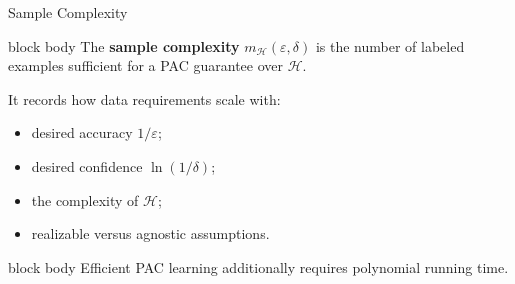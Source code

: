 \documentclass[aspectratio=169,10pt]{beamer}
\newcommand{\Hc}{\mathcal{H}}
\newcommand{\eps}{\varepsilon}
\begin{document}
\begin{frame}[t]{Sample Complexity}
  \vspace{0.05cm}
  \begin{beamercolorbox}[rounded=true,sep=0.20cm,wd=\linewidth]{block body}
    The \textbf{sample complexity} $m_{\Hc}(\eps,\delta)$ is the number of labeled examples sufficient for a PAC guarantee over $\Hc$.
  \end{beamercolorbox}
  \vspace{0.18cm}
  It records how data requirements scale with:
  \begin{itemize}
    \setlength{\itemsep}{0.18cm}
    \item desired accuracy $1/\eps$;
    \item desired confidence $\ln(1/\delta)$;
    \item the complexity of $\Hc$;
    \item realizable versus agnostic assumptions.
  \end{itemize}
  \vspace{0.12cm}
  \begin{beamercolorbox}[rounded=true,sep=0.16cm,wd=0.94\linewidth,center]{block body}
    Efficient PAC learning additionally requires polynomial running time.
  \end{beamercolorbox}
\end{frame}
\end{document}
